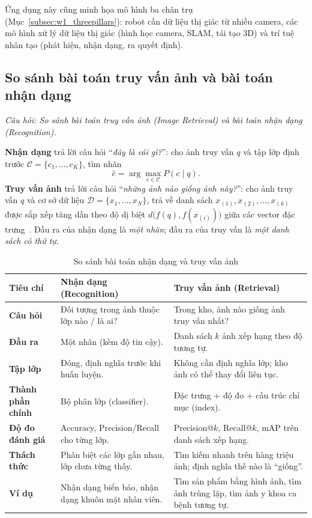 Ứng dụng này cũng minh họa mô hình ba chân trụ (Mục~\ref{subsec:w1_threepillars}): robot cần dữ liệu thị giác từ nhiều camera, các mô hình xử lý dữ liệu thị giác (hình học camera, SLAM, tái tạo 3D) và trí tuệ nhân tạo (phát hiện, nhận dạng, ra quyết định).

\subsection{So sánh bài toán truy vấn ảnh và bài toán nhận dạng}
\label{subsec:w2_retrieval}

\textit{Câu hỏi: So sánh bài toán truy vấn ảnh (Image Retrieval) và bài toán nhận dạng (Recognition).}

\textbf{Nhận dạng} trả lời câu hỏi ``\emph{đây là cái gì?}'': cho ảnh truy vấn $q$ và tập lớp định trước $\mathcal{C} = \{c_1, \ldots, c_K\}$, tìm nhãn
\begin{equation}
\hat{c} = \arg\max_{c \in \mathcal{C}} P(c \mid q).
\end{equation}
\textbf{Truy vấn ảnh} trả lời câu hỏi ``\emph{những ảnh nào giống ảnh này?}'': cho ảnh truy vấn $q$ và cơ sở dữ liệu $\mathcal{D} = \{x_1, \ldots, x_N\}$, trả về danh sách $x_{(1)}, x_{(2)}, \ldots, x_{(k)}$ được sắp xếp tăng dần theo độ dị biệt $d\big(f(q), f(x_{(i)})\big)$ giữa các vector đặc trưng~\citep{smeulders2000content}. Đầu ra của nhận dạng là \emph{một nhãn}; đầu ra của truy vấn là \emph{một danh sách có thứ tự}.

\begin{table}[ht]
\centering
\small
\caption{So sánh bài toán nhận dạng và truy vấn ảnh}
\label{tab:w2_retrieval}
\renewcommand{\arraystretch}{1.3}
\begin{tabularx}{\textwidth}{|p{2.6cm}|X|X|}
\hline
\textbf{Tiêu chí} & \textbf{Nhận dạng (Recognition)} & \textbf{Truy vấn ảnh (Retrieval)} \\
\hline
\textbf{Câu hỏi} & Đối tượng trong ảnh thuộc lớp nào / là ai? & Trong kho, ảnh nào giống ảnh truy vấn nhất? \\
\hline
\textbf{Đầu ra} & Một nhãn (kèm độ tin cậy). & Danh sách $k$ ảnh xếp hạng theo độ tương tự. \\
\hline
\textbf{Tập lớp} & Đóng, định nghĩa trước khi huấn luyện. & Không cần định nghĩa lớp; kho ảnh có thể thay đổi liên tục. \\
\hline
\textbf{Thành phần chính} & Bộ phân lớp (classifier). & Đặc trưng + độ đo + cấu trúc chỉ mục (index). \\
\hline
\textbf{Độ đo đánh giá} & Accuracy, Precision/Recall cho từng lớp. & Precision@$k$, Recall@$k$, mAP trên danh sách xếp hạng. \\
\hline
\textbf{Thách thức} & Phân biệt các lớp gần nhau, lớp chưa từng thấy. & Tìm kiếm nhanh trên hàng triệu ảnh; định nghĩa thế nào là ``giống''. \\
\hline
\textbf{Ví dụ} & Nhận dạng biển báo, nhận dạng khuôn mặt nhân viên. & Tìm sản phẩm bằng hình ảnh, tìm ảnh trùng lặp, tìm ảnh y khoa ca bệnh tương tự. \\
\hline
\end{tabularx}
\end{table}

